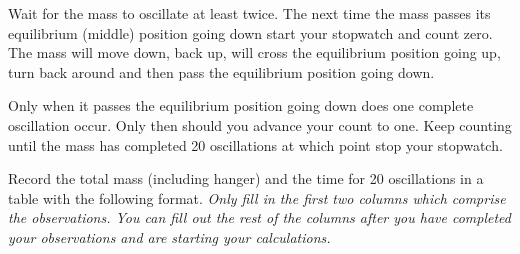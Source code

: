         Wait for the mass to oscillate at least twice. The next time the mass passes its equilibrium (middle) position going down start your stopwatch and count zero. The mass will move down, back up, will cross the equilibrium position going up, turn back around and then pass the equilibrium position going down.

        Only when it passes the equilibrium position going down does one complete oscillation occur. Only then should you advance your count to one. Keep counting until the mass has completed 20 oscillations at which point stop your stopwatch.

        Record the total mass (including hanger) and the time for 20 oscillations in a table with the following format. \textit{Only fill in the first two columns which comprise the observations. You can fill out the rest of the columns after you have completed your observations and are starting your calculations.}

